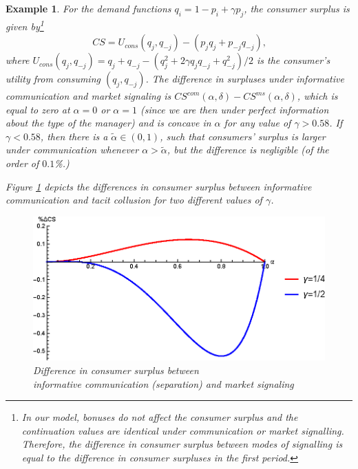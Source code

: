 \documentclass[]{article}
\newtheorem{example}{Example}
\begin{document}
\begin{example}
For the demand functions $q_i=1-p_i+\gamma p_j$, the consumer surplus is given by\footnote{%
In our model, bonuses do not affect the consumer surplus and the continuation values are identical under communication or market signalling. Therefore, the difference in consumer surplus between modes of signalling is equal to the difference in consumer surpluses in the first period.}
\begin{equation*}
CS=U_{cons}(q_j,q_{-j})-(p_j q_j+p_{-j} q_{-j})\text{,}
\end{equation*}
where $U_{cons}(q_j,q_{-j})=q_j+q_{-j}-(q_j^2+2\gamma q_j q_{-j}+q_{-j}^2)/2$ is the consumer's utility from consuming $(q_j,q_{-j})$.
The difference in surpluses under informative communication and market signaling is  $CS^{com}(\alpha,\delta)-CS^{ms}(\alpha,\delta)$, which is equal to zero at $\alpha=0$ or $\alpha=1$ (since we are then under perfect information about the type of the manager) and is concave in $\alpha$ for any value of $\gamma > 0.58$. If $\gamma < 0.58$, then there is a $\tilde{\alpha}\in(0,1)$, such that consumers' surplus is larger under  communication whenever $\alpha>\tilde{\alpha}$, but the difference is negligible (of the order of $0.1$\%.)

Figure \ref{fig:cs2} depicts the differences in consumer surplus between informative communication and tacit collusion for two different values of $\gamma$.
%
\begin{figure}[ht]
\centering
\includegraphics[scale=0.9]{Plots/Bertrand_CS.eps}
\caption{Difference in consumer surplus between \\informative communication (separation) and market signaling}\label{fig:cs2}
\end{figure}


\end{example}

\end{document}
